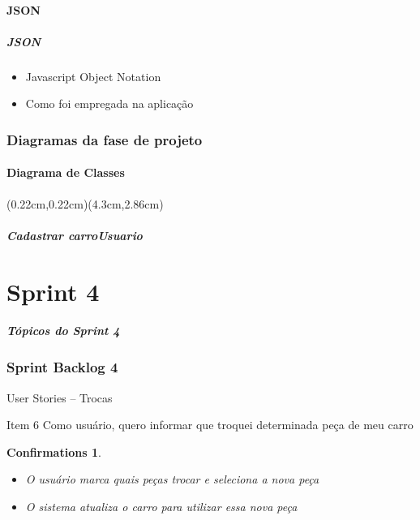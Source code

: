 \documentclass[hyperref={pdfpagelabels=false},11pt]{beamer}
\newtheorem{confirmations}[theorem]{Confirmations}
\begin{document}
			\subsection{JSON}
				\begin{frame}
					\frametitle{JSON}
					\begin{itemize}
						\item{Javascript Object Notation}
						\item{Como foi empregada na aplicação}
					\end{itemize}
				\end{frame}
				
		\section{Diagramas da fase de projeto}
			\subsection{Diagrama de Classes}
				\begin{frame}
					(0.22cm,0.22cm)(4.3cm,2.86cm)
					\frametitle{Cadastrar carroUsuario}
				\end{frame}
		
	\part{Sprint 4}
		
		\begin{frame}
			\frametitle{Tópicos do Sprint 4}
			\tableofcontents[pausesections]
		\end{frame}
			
 		\section{Sprint Backlog 4}
			\begin{frame}{User Stories -- Trocas}
				\begin{block}{Item 6}
					Como usuário, quero informar que troquei determinada peça de meu carro
					\begin{confirmations}
						\begin{itemize}
							\item{O usuário marca quais peças trocar e seleciona a nova peça}
							\item{O sistema atualiza o carro para utilizar essa nova peça}
						\end{itemize}
					\end{confirmations}
				\end{block}
			\end{frame}
			
\end{document}

